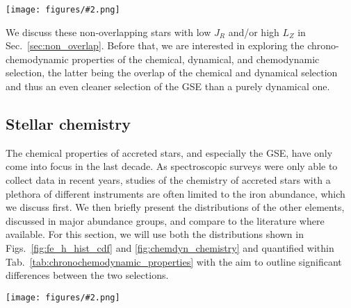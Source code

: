 \documentclass[fleqn,usenatbib]{mnras}
\newcommand{\codeicon}{{\faCloudDownload}}
\newcommand{\codelink}[1]{\href{https://github.com/svenbuder/buder_galah_accreted_chemistry/tree/main/figures/#1.ipynb}{\codeicon}\,\,}
\newcommand{\oscaption}[2]{\caption{#2 \codelink{#1}}}
\newcommand{\figuretextwidth}[4]{\begin{figure*} \centering \texttt{[image: figures/\#2.png]}\oscaption{#3}{#4}\label{fig:#2} \end{figure*}}
\begin{document}
\figuretextwidth{17cm}{fe_h_hist_cdf}{chronochemodynamic_comparison}{
\textbf{Relative (top panels) and cumulative (bottom panels) distribution of iron abundances [Fe/H] for our samples of accreted stars.} \textbf{Left panels a and c} show chemically selected accreted stars and compare with the results by \citet{Das2020}.
\textbf{Right panels b and d} show the dynamical selections of the GSE by our work and \citet{Feuillet2020, Feuillet2021} as well as \citet{Naidu2020}.
}

We discuss these non-overlapping stars with low $J_R$ and/or high $L_Z$ in Sec.~\ref{sec:non_overlap}. Before that, we are interested in exploring the chrono-chemodynamic properties of the chemical, dynamical, and chemodynamic selection, the latter being the overlap of the chemical and dynamical selection and thus an even cleaner selection of the GSE than a purely dynamical one.

\subsection{Stellar chemistry} \label{sec:gse_stellar_chemistry}

The chemical properties of accreted stars, and especially the GSE, have only come into focus in the last decade. As spectroscopic surveys were only able to collect data in recent years, studies of the chemistry of accreted stars with a plethora of different instruments are often limited to the iron abundance, which we discuss first. We then briefly present the distributions of the other elements, discussed in major abundance groups, and compare to the literature where available. For this section, we will use both the distributions shown in Figs.~\ref{fig:fe_h_hist_cdf} and \ref{fig:chemdyn_chemistry} and quantified within Tab.~\ref{tab:chronochemodynamic_properties} with the aim to outline significant differences between the two selections.

\figuretextwidth{17cm}{chemdyn_chemistry}{chronochemodynamic_comparison}{
\textbf{Abundance distributions [X/Fe] (and absolute abundance for Li) as a function of iron abundance [Fe/H] for elements X (noted in each panel).} Shown are the distributions of all GALAH+ DR3 stars (black contours) as well as those of the chemically selected (orange contours) and dynamically selected (red contours). Quantities of each distributions are listed in Tab.~\ref{tab:chronochemodynamic_properties} together with the distribution of the stars within both the chemical and dynamical selection.
}
\end{document}
